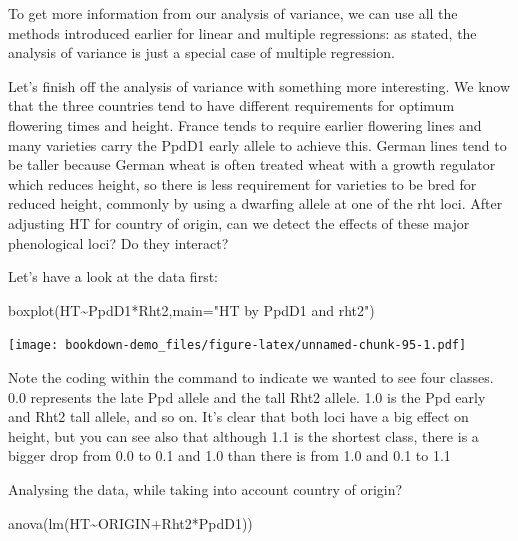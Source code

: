 \documentclass[
]{book}
\newenvironment{Shaded}{\begin{snugshade}}{\end{snugshade}}
\newcommand{\AttributeTok}[1]{\textcolor[rgb]{0.77,0.63,0.00}{#1}}
\newcommand{\FunctionTok}[1]{\textcolor[rgb]{0.00,0.00,0.00}{#1}}
\newcommand{\NormalTok}[1]{#1}
\newcommand{\SpecialCharTok}[1]{\textcolor[rgb]{0.00,0.00,0.00}{#1}}
\newcommand{\StringTok}[1]{\textcolor[rgb]{0.31,0.60,0.02}{#1}}
\begin{document}
To get more information from our analysis of variance, we can use all the methods introduced earlier for linear and multiple regressions: as stated, the analysis of variance is just a special case of multiple regression.

Let's finish off the analysis of variance with something more interesting. We know that the three countries tend to have different requirements for optimum flowering times and height. France tends to require earlier flowering lines and many varieties carry the PpdD1 early allele to achieve this. German lines tend to be taller because German wheat is often treated wheat with a growth regulator which reduces height, so there is less requirement for varieties to be bred for reduced height, commonly by using a dwarfing allele at one of the rht loci. After adjusting HT for country of origin, can we detect the effects of these major phenological loci? Do they interact?

Let's have a look at the data first:

\begin{Shaded}
\begin{Highlighting}[]
\FunctionTok{boxplot}\NormalTok{(HT}\SpecialCharTok{\textasciitilde{}}\NormalTok{PpdD1}\SpecialCharTok{*}\NormalTok{Rht2,}\AttributeTok{main=}\StringTok{"HT by PpdD1 and rht2"}\NormalTok{)}
\end{Highlighting}
\end{Shaded}

\texttt{[image: bookdown-demo\_files/figure-latex/unnamed-chunk-95-1.pdf]}

Note the coding within the command to indicate we wanted to see four classes. 0.0 represents the late Ppd allele and the tall Rht2 allele. 1.0 is the Ppd early and Rht2 tall allele, and so on. It's clear that both loci have a big effect on height, but you can see also that although 1.1 is the shortest class, there is a bigger drop from 0.0 to 0.1 and 1.0 than there is from 1.0 and 0.1 to 1.1

Analysing the data, while taking into account country of origin?

\begin{Shaded}
\begin{Highlighting}[]
\FunctionTok{anova}\NormalTok{(}\FunctionTok{lm}\NormalTok{(HT}\SpecialCharTok{\textasciitilde{}}\NormalTok{ORIGIN}\SpecialCharTok{+}\NormalTok{Rht2}\SpecialCharTok{*}\NormalTok{PpdD1))}
\end{Highlighting}
\end{Shaded}
\end{document}
